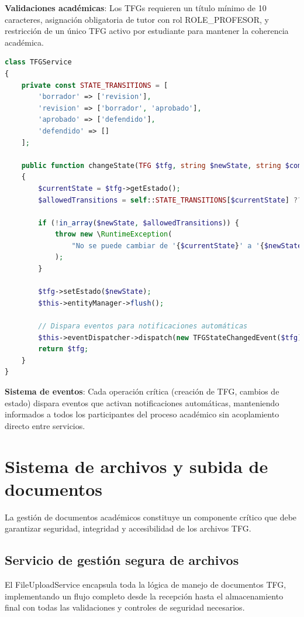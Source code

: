 \documentclass[12pt,a4paper,oneside]{report}
\begin{document}
\textbf{Validaciones académicas}: Los TFGs requieren un título mínimo de 10 caracteres, asignación obligatoria de tutor con rol ROLE\_PROFESOR, y restricción de un único TFG activo por estudiante para mantener la coherencia académica.

\begin{lstlisting}[language=PHP]
class TFGService
{
    private const STATE_TRANSITIONS = [
        'borrador' => ['revision'],
        'revision' => ['borrador', 'aprobado'],
        'aprobado' => ['defendido'],
        'defendido' => []
    ];

    public function changeState(TFG $tfg, string $newState, string $comment = ''): TFG
    {
        $currentState = $tfg->getEstado();
        $allowedTransitions = self::STATE_TRANSITIONS[$currentState] ?? [];

        if (!in_array($newState, $allowedTransitions)) {
            throw new \RuntimeException(
                "No se puede cambiar de '{$currentState}' a '{$newState}'"
            );
        }

        $tfg->setEstado($newState);
        $this->entityManager->flush();

        // Dispara eventos para notificaciones automáticas
        $this->eventDispatcher->dispatch(new TFGStateChangedEvent($tfg));
        return $tfg;
    }
}
\end{lstlisting}

\textbf{Sistema de eventos}: Cada operación crítica (creación de TFG, cambios de estado) dispara eventos que activan notificaciones automáticas, manteniendo informados a todos los participantes del proceso académico sin acoplamiento directo entre servicios.

\section{Sistema de archivos y subida de documentos}\label{sistema-de-archivos-y-subida-de-documentos}

La gestión de documentos académicos constituye un componente crítico que debe garantizar seguridad, integridad y accesibilidad de los archivos TFG. 

\subsection{Servicio de gestión segura de archivos}\label{fileuploadservice}

El FileUploadService encapsula toda la lógica de manejo de documentos TFG, implementando un flujo completo desde la recepción hasta el almacenamiento final con todas las validaciones y controles de seguridad necesarios.
\end{document}
